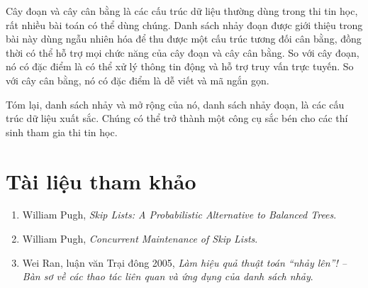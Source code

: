 \documentclass[11pt]{article}
\begin{document}
Cây đoạn và cây cân bằng là các cấu trúc dữ liệu thường dùng trong thi tin
học, rất nhiều bài toán có thể dùng chúng. Danh sách nhảy đoạn được giới thiệu
trong bài này dùng ngẫu nhiên hóa để thu được một cấu trúc tương đối cân bằng,
đồng thời có thể hỗ trợ mọi chức năng của cây đoạn và cây cân bằng. So với cây
đoạn, nó có đặc điểm là có thể xử lý thông tin động và hỗ trợ truy vấn trực
tuyến. So với cây cân bằng, nó có đặc điểm là dễ viết và mã ngắn gọn.

Tóm lại, danh sách nhảy và mở rộng của nó, danh sách nhảy đoạn, là các cấu
trúc dữ liệu xuất sắc. Chúng có thể trở thành một công cụ sắc bén cho các thí
sinh tham gia thi tin học.

\section*{Tài liệu tham khảo}

\begin{enumerate}
  \item William Pugh, \textit{Skip Lists: A Probabilistic Alternative to
  Balanced Trees}.
  \item William Pugh, \textit{Concurrent Maintenance of Skip Lists}.
  \item Wei Ran, luận văn Trại đông 2005, \textit{Làm hiệu quả thuật toán
  ``nhảy lên''! -- Bàn sơ về các thao tác liên quan và ứng dụng của danh sách
  nhảy}.
\end{enumerate}
\end{document}

